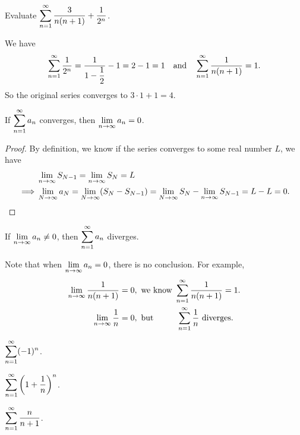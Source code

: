 \begin{ex}
    Evaluate $\displaystyle\sum_{n=1}^\infty \dfrac{3}{n(n+1)} + \dfrac{1}{2^n}$.
    
    We have 
    \begin{align*}
        \displaystyle\sum_{n=1}^\infty \dfrac{1}{2^n} = \dfrac{1}{1-\dfrac{1}{2}} - 1 = 2-1 = 1 \quad \text{and} \quad \displaystyle\sum_{n=1}^\infty \dfrac{1}{n(n+1)} = 1.
    \end{align*}
    So the original series converges to $3\cdot 1 + 1 = 4$.
\end{ex}

\begin{thm}
    If $\displaystyle\sum_{n=1}^\infty a_n$ converges, then $\displaystyle\lim_{n\to \infty} a_n = 0$.
\end{thm}
\begin{proof}
    By definition, we know if the series converges to some real number $L$, we have
    \begin{align*}
        &\displaystyle\lim_{n\to \infty} S_{N-1} = \displaystyle\lim_{n\to \infty} S_N = L\\
        \implies &\displaystyle\lim_{N\to \infty} a_N = \displaystyle\lim_{N\to \infty} (S_N - S_{N-1}) = \displaystyle\lim_{N\to \infty} S_N - \displaystyle\lim_{n\to \infty} S_{N-1} = L - L = 0.
    \end{align*}
\end{proof}

\begin{coro} 
    If $\displaystyle\lim_{n \to \infty} a_n \neq 0$, then $\displaystyle\sum_{n=1}^\infty a_n$ diverges.
\end{coro}

\begin{rmk}
    Note that when $\displaystyle\lim_{n\to\infty} a_n = 0$, there is no conclusion. For example, 
    \begin{align*}
        \displaystyle\lim_{n \to \infty} \dfrac{1}{n(n+1)} &= 0, \text{ we know } \displaystyle\sum_{n=1}^\infty \dfrac{1}{n(n+1)} = 1.\\
        \displaystyle\lim_{n \to \infty} \dfrac{1}{n} &= 0, \text{ but } \hspace{25pt}\displaystyle\sum_{n=1}^\infty \dfrac{1}{n} \text{ diverges}.
    \end{align*}
\end{rmk}

\begin{ex} \leavevmode
    \begin{enumerate*}
        \item $\displaystyle\sum_{n=1}^\infty (-1)^n$.
        \item $\displaystyle\sum_{n=1}^\infty \left( 1+\dfrac{1}{n} \right)^n$.
        \item $\displaystyle\sum_{n=1}^\infty \dfrac{n}{n+1}$.
    \end{enumerate*}
\end{ex}


